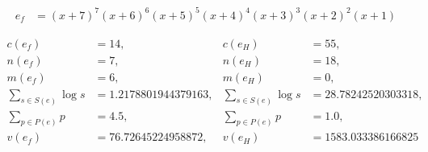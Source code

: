 \documentclass[]{elsarticle}
\begin{document}
\begin{example}
	\begin{align*}
		e_f &= \left(x+7\right)^{7} \left(x+6\right)^{6} \left(x+5\right)^{5} \left(x+4
		\right)^{4} \left(x+3\right)^{3} \left(x+2\right)^{2} \left(x+1\right)
	\end{align*}

	\begin{align*}
		c(e_f) &= 14, & c(e_H) &= 55, \\
		n(e_f) &= 7, & n(e_H) &= 18, \\
		m(e_f) &= 6, & m(e_H) &= 0, \\
		\sum_{s\in S(e)}\log s &= 1.2178801944379163, & \sum_{s\in S(e)}\log s &= 28.78242520303318, \\
		\sum_{p\in P(e)}p &= 4.5, & \sum_{p\in P(e)}p &= 1.0, \\
		v(e_f) &= 76.72645224958872, & v(e_H) &= 1583.033386166825
	\end{align*}
\end{example}
\fi



\end{document}
